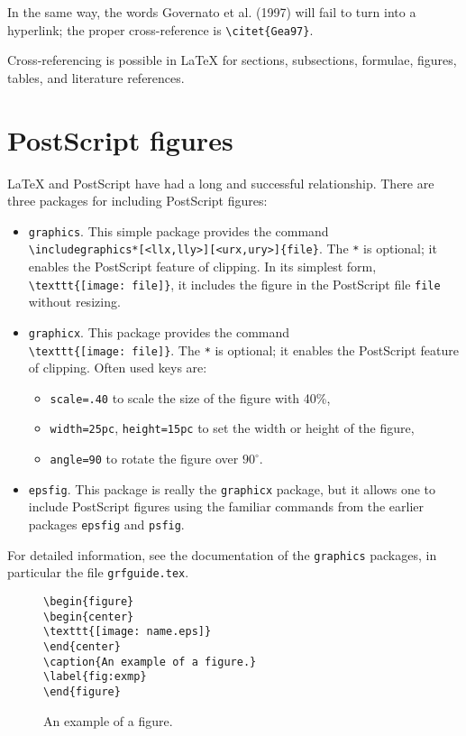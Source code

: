 \documentclass{elsart}
\begin{document}
In the same way, the words Governato et al. (1997) will fail to
turn into a hyperlink; the proper cross-reference is 
\verb|\citet{Gea97}|.

Cross-referencing is possible in \LaTeX{} for sections, subsections,
formulae, figures, tables, and literature references.

\section{PostScript figures}
\label{psfigs}

\LaTeX{} and PostScript have had a long and successful relationship.
There are three packages for including PostScript figures:
\begin{itemize}
\item \texttt{graphics}.
This simple package provides the command\\
\verb|\includegraphics*[<llx,lly>][<urx,ury>]{file}|.
The \texttt{*} is optional; it enables the PostScript feature of clipping.
In its simplest form,\\
\verb|\texttt{[image: file]}|,
it includes the figure in the PostScript file \texttt{file}
without resizing.
\item \texttt{graphicx}.
This package provides the command\\
\verb|\texttt{[image: file]}|.
The \texttt{*} is optional; it enables the PostScript feature of clipping.
Often used keys are:
\def\labelitemii{--}
\begin{itemize}
\item \texttt{scale=.40} to scale the size of the figure with 40\%,
\item \texttt{width=25pc}, \texttt{height=15pc} to set the width or
height of the figure,
\item \texttt{angle=90} to rotate the figure over $90^\circ$.
\end{itemize}
\item \texttt{epsfig}.
This package is really the \texttt{graphicx} package,
but it allows one to include PostScript figures using 
the familiar commands from 
the earlier packages \texttt{epsfig} and \texttt{psfig}.
\end{itemize}
For detailed information, see the documentation of the \texttt{graphics}
packages, in particular the file \texttt{grfguide.tex}.
\begin{figure}
\leftmargin=2pc
\begin{verbatim}
\begin{figure}
\begin{center}
\texttt{[image: name.eps]}
\end{center}
\caption{An example of a figure.}
\label{fig:exmp}
\end{figure}
\end{verbatim} 
\caption{An example of a figure.}
\label{fig:exmp}
\end{figure}
\end{document}
